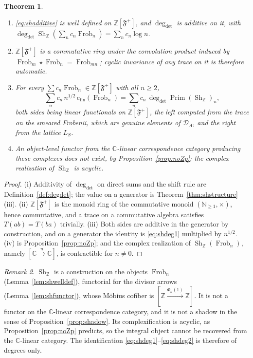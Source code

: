 \documentclass[11pt]{amsart}
\newtheorem{theorem}{Theorem}[section]
\theoremstyle{definition}
\theoremstyle{remark}
\newtheorem{remark}[theorem]{Remark}
\newcommand{\C}{\mathbb C}
\newcommand{\N}{\mathbb N}
\newcommand{\Z}{\mathbb Z}
\newcommand{\Frob}{\operatorname{Frob}}
\newcommand{\Sh}{\operatorname{Sh}}
\newcommand{\Prim}{\operatorname{Prim}}
\newcommand{\degdet}{\operatorname{deg}_{\mathrm{det}}}
\newcommand{\DA}{\mathcal D_A}
\newcommand{\cfin}{\mathrm{c}_{\mathrm{fin}}}
\begin{document}
\begin{theorem}\label{thm:additiveext}
\begin{enumerate}
\item[(i)] \eqref{eq:shadditive} is well defined on $\Z[\mathfrak F^+]$, and
$\degdet$ is additive on it, with
$\degdet\Sh_\Z(\sum_nc_n\Frob_n)=\sum_nc_n\log n$.
\item[(ii)] $\Z[\mathfrak F^+]$ is a commutative ring under the convolution
product induced by $\Frob_m\star\Frob_n=\Frob_{mn}$; cyclic invariance of any
trace on it is therefore automatic.
\item[(iii)] For every $\sum c_n\Frob_n\in\Z[\mathfrak F^+]$ with all $n\ge2$,
\begin{equation}\label{eq:linearcomparison}
  \sum_nc_n\,n^{1/2}\,\cfin(\Frob_n)=\sum_nc_n\,\degdet\Prim(\Sh_\Z)_n,
\end{equation}
both sides being linear functionals on $\Z[\mathfrak F^+]$, the left computed
from the trace on the smeared Frobenii, which are genuine elements of $\DA$,
and the right from the lattice $L_S$.
\item[(iv)] An object-level functor from the $\C$-linear correspondence
category producing these complexes does not exist, by
Proposition~\ref{prop:noZp}; the complex realization of $\Sh_\Z$ is acyclic.
\end{enumerate}
\end{theorem}

\begin{proof}
(i) Additivity of $\degdet$ on direct sums and the shift rule are
Definition~\ref{def:degdet}; the value on a generator is
Theorem~\ref{thm:shstructure}(iii). (ii) $\Z[\mathfrak F^+]$ is the monoid ring
of the commutative monoid $(\N_{\ge1},\times)$, hence commutative, and a trace
on a commutative algebra satisfies $T(ab)=T(ba)$ trivially. (iii) Both sides are
additive in the generator by construction, and on a generator the identity is
\eqref{eq:shdeg1} multiplied by $n^{1/2}$. (iv) is
Proposition~\ref{prop:noZp}; and the complex realization of
$\Sh_\Z(\Frob_n)$, namely $[\C\xrightarrow{n}\C]$, is contractible for $n\ne0$.
\end{proof}

\begin{remark}\label{rem:shadowlimits}
$\Sh_\Z$ is a construction on the objects $\Frob_n$
(Lemma~\ref{lem:shwelldef}), functorial for the divisor arrows
(Lemma~\ref{lem:shfunctor}), whose M\"obius cofiber is
$[\Z\xrightarrow{\Phi_n(1)}\Z]$. It is not a functor on the $\C$-linear
correspondence category, and it is not a shadow in the sense of
Proposition~\ref{prop:shadow}.  Its complexification is acyclic, as
Proposition~\ref{prop:noZp} predicts, so the integral object cannot be
recovered from the $\C$-linear category.  The identification \eqref{eq:shdeg1}--\eqref{eq:shdeg2} is therefore of degrees
only.
\end{remark}
\end{document}
